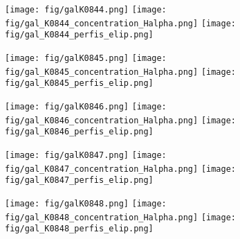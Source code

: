 \begin{figure}[!ht]
\begin{center}
\setcaptionmargin{1cm}
\texttt{[image: fig/galK0844.png]}
\texttt{[image: fig/gal\_K0844\_concentration\_Halpha.png]}
\texttt{[image: fig/gal\_K0844\_perfis\_elip.png]}
\end{center}
\end{figure}


\begin{figure}[!ht]
\begin{center}
\setcaptionmargin{1cm}
\texttt{[image: fig/galK0845.png]}
\texttt{[image: fig/gal\_K0845\_concentration\_Halpha.png]}
\texttt{[image: fig/gal\_K0845\_perfis\_elip.png]}
\end{center}
\end{figure}


\begin{figure}[!ht]
\begin{center}
\setcaptionmargin{1cm}
\texttt{[image: fig/galK0846.png]}
\texttt{[image: fig/gal\_K0846\_concentration\_Halpha.png]}
\texttt{[image: fig/gal\_K0846\_perfis\_elip.png]}
\end{center}
\end{figure}


\begin{figure}[!ht]
\begin{center}
\setcaptionmargin{1cm}
\texttt{[image: fig/galK0847.png]}
\texttt{[image: fig/gal\_K0847\_concentration\_Halpha.png]}
\texttt{[image: fig/gal\_K0847\_perfis\_elip.png]}
\end{center}
\end{figure}


\begin{figure}[!ht]
\begin{center}
\setcaptionmargin{1cm}
\texttt{[image: fig/galK0848.png]}
\texttt{[image: fig/gal\_K0848\_concentration\_Halpha.png]}
\texttt{[image: fig/gal\_K0848\_perfis\_elip.png]}
\end{center}
\end{figure}


